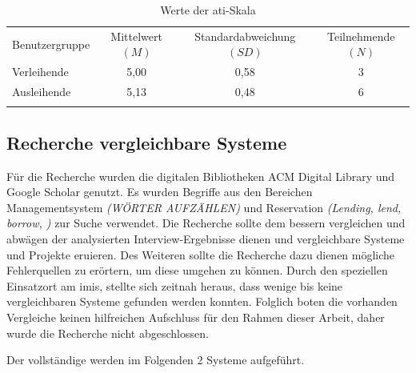 \begin{table}[h]
        \centering
        \caption{Werte der \ac{ati}-Skala}
        \begin{tabular}{lccc}
                \arrayrulecolor{maincolor}\hline
                \sffamily\color{maincolor}Benutzergruppe & \sffamily\color{maincolor}Mittelwert
                $(M)$                                    & \sffamily\color{maincolor}Standardabweichung $(SD)$ &
                \sffamily\color{maincolor}Teilnehmende $(N)$                                                          \\
                \arrayrulecolor{maincolor}\hline
                Verleihende                              & 5,00                                                & 0,58
                                                         & 3                                                          \\
                Ausleihende                              & 5,13                                                & 0,48
                                                         & 6                                                          \\
                \arrayrulecolor{maincolor}\hline
        \end{tabular}
        \label{table:ati}
\end{table}

\subsection{Recherche vergleichbare Systeme}
\label{subsection:system}
Für die Recherche wurden die digitalen Bibliotheken ACM Digital Library und Google Scholar genutzt.
Es wurden Begriffe aus den Bereichen Managementsystem \textit{(WÖRTER AUFZÄHLEN)} und Reservation \textit{(Lending, lend,
        borrow, )} zur Suche verwendet. Die Recherche sollte dem bessern vergleichen und abwägen der
analysierten Interview-Ergebnisse dienen und vergleichbare Systeme und Projekte eruieren. Des
Weiteren sollte die Recherche dazu dienen mögliche Fehlerquellen zu erörtern, um diese umgehen zu
können. Durch den speziellen Einsatzort am \ac{imis}, stellte sich zeitnah heraus, dass wenige bis
keine vergleichbaren Systeme gefunden werden konnten. Folglich boten die vorhanden Vergleiche keinen
hilfreichen Aufschluss für den Rahmen dieser Arbeit, daher wurde die Recherche nicht abgeschlossen.

Der vollständige werden im Folgenden 2 Systeme aufgeführt.



